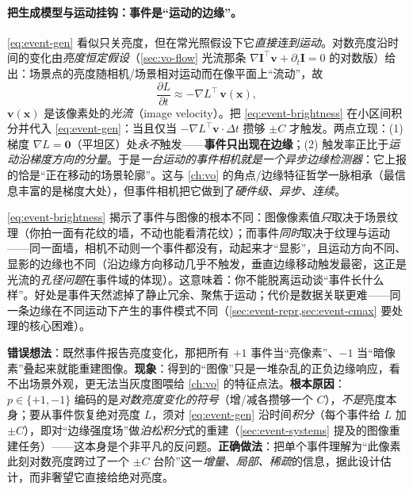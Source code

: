 \paragraph{把生成模型与运动挂钩：事件是“运动的边缘”。}
\cref{eq:event-gen} 看似只关亮度，但在常光照假设下它\emph{直接连到运动}。对数亮度沿时间的变化由\emph{亮度恒定假设}（\cref{sec:vo-flow} 光流那条 $\nabla\mathbf I^\top\mathbf v+\partial_t\mathbf I=0$ 的对数版）给出：场景点的亮度随相机/场景相对运动而在像平面上“流动”，故
\begin{equation}
  \frac{\partial L}{\partial t}\approx-\nabla L^\top\,\mathbf v(\mathbf x),
  \label{eq:event-brightness}
\end{equation}
$\mathbf v(\mathbf x)$ 是该像素处的\emph{光流}（image velocity）。把 \cref{eq:event-brightness} 在小区间积分并代入 \cref{eq:event-gen}：当且仅当 $-\nabla L^\top\mathbf v\cdot\Delta t$ 攒够 $\pm C$ 才触发。两点立现：(1) 梯度 $\nabla L=\mathbf 0$（平坦区）处\emph{永不}触发——\textbf{事件只出现在边缘}；(2) 触发率正比于\emph{运动沿梯度方向的分量}。于是\emph{一台运动的事件相机就是一个异步边缘检测器}\cite{gallego2022eventsurvey}：它上报的恰是“正在移动的场景轮廓”。这与 \cref{ch:vo} 的角点/边缘特征哲学一脉相承（最信息丰富的是梯度大处），但事件相机把它做到了\emph{硬件级、异步、连续}。

\begin{insight}
\cref{eq:event-brightness} 揭示了事件与图像的根本不同：图像像素值\emph{只}取决于场景纹理（你拍一面有花纹的墙，不动也能看清花纹）；而事件\emph{同时}取决于纹理与运动——同一面墙，相机不动则一个事件都没有，动起来才“显影”，且运动方向不同、显影的边缘也不同（沿边缘方向移动几乎不触发，垂直边缘移动触发最密，这正是光流的\emph{孔径问题}在事件域的体现）。这意味着：你不能脱离运动谈“事件长什么样”。好处是事件天然滤掉了静止冗余、聚焦于运动；代价是数据关联更难——同一条边缘在不同运动下产生的事件模式不同（\cref{sec:event-repr,sec:event-cmax} 要处理的核心困难）。
\end{insight}

\begin{pitfall}
\textbf{错误想法}：既然事件报告亮度变化，那把所有 $+1$ 事件当“亮像素”、$-1$ 当“暗像素”叠起来就能重建图像。\textbf{现象}：得到的“图像”只是一堆杂乱的正负边缘响应，看不出场景外观，更无法当灰度图喂给 \cref{ch:vo} 的特征点法。\textbf{根本原因}：$p\in\{+1,-1\}$ 编码的是\emph{对数亮度变化的符号}（增/减各攒够一个 $C$），\emph{不是}亮度本身；要从事件恢复绝对亮度 $L$，须对 \cref{eq:event-gen} 沿时间\emph{积分}（每个事件给 $L$ 加 $\pm C$），即对“边缘强度场”做\emph{泊松积分}式的重建（\cref{sec:event-systems} 提及的图像重建任务）——这本身是个非平凡的反问题。\textbf{正确做法}：把单个事件理解为“此像素此刻对数亮度跨过了一个 $\pm C$ 台阶”这一\emph{增量、局部、稀疏}的信息，据此设计估计，而非奢望它直接给绝对亮度。
\end{pitfall}

